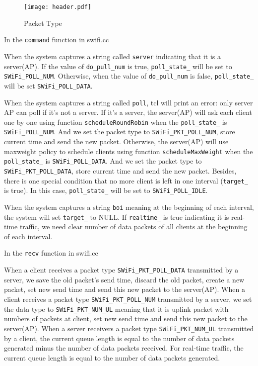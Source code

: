 \documentclass{article}
\begin{document}
\begin{figure}[H]
\centering
\texttt{[image: header.pdf]}
\caption{Packet Type}
\end{figure}


In the \lstinline |command| function in swifi.cc

When the system captures a string called  \lstinline |server| indicating that it is a server(AP). If the value of  \lstinline |do_pull_num|  is true,  \lstinline |poll_state_|  will be set to  \lstinline |SWiFi_POLL_NUM|. Otherwise, when the value of  \lstinline |do_pull_num|  is false,   \lstinline |poll_state_|  will be set  \lstinline |SWiFi_POLL_DATA|. 


When the system captures a string called  \lstinline |poll|, tcl will print an error: only server AP can poll if it's not a server. If it's a server, the server(AP) will ask each client one by one using function \lstinline |scheduleRoundRobin| when the \lstinline |poll_state_| is  \lstinline |SWiFi_POLL_NUM|. And we set the packet type to \lstinline |SWiFi_PKT_POLL_NUM|, store current time and send the new packet. Otherwise, the server(AP) will use maxweight policy to schedule clients using function \lstinline |scheduleMaxWeight| when the \lstinline |poll_state_| is  \lstinline |SWiFi_POLL_DATA|. And we set the packet type to \lstinline |SWiFi_PKT_POLL_DATA|, store current time and send the new packet. Besides, there is one special condition that no more client is left in one interval (\lstinline |target_| is true). In this case, \lstinline |poll_state_| will be set to \lstinline |SWiFi_POLL_IDLE|.


When the system captures a string \lstinline |boi| meaning at the beginning of each interval, the system will set \lstinline |target_| to NULL. If  \lstinline |realtime_|  is true indicating it is real-time traffic, we need clear number of data packets of all clients at the beginning of each interval. 

In the  \lstinline |recv| function in swifi.cc

When a client receives a packet type \lstinline |SWiFi_PKT_POLL_DATA| transmitted by a server, we save the old packet's send time, discard the old packet, create a new packet, set new send time and send this new packet to the server(AP). 
When a client receives a packet type \lstinline |SWiFi_PKT_POLL_NUM| transmitted by a server, we set the data type to \lstinline |SWiFi_PKT_NUM_UL| meaning that it is uplink packet with numbers of packets at client, set new send time and send this new packet to the server(AP).
When a server receivers  a packet type \lstinline |SWiFi_PKT_NUM_UL| transmitted by a client, the current queue length is equal to the number of data packets generated minus the number of data packets received. For real-time traffic, the current queue length is equal to the number of data packets generated.  
\end{document}

